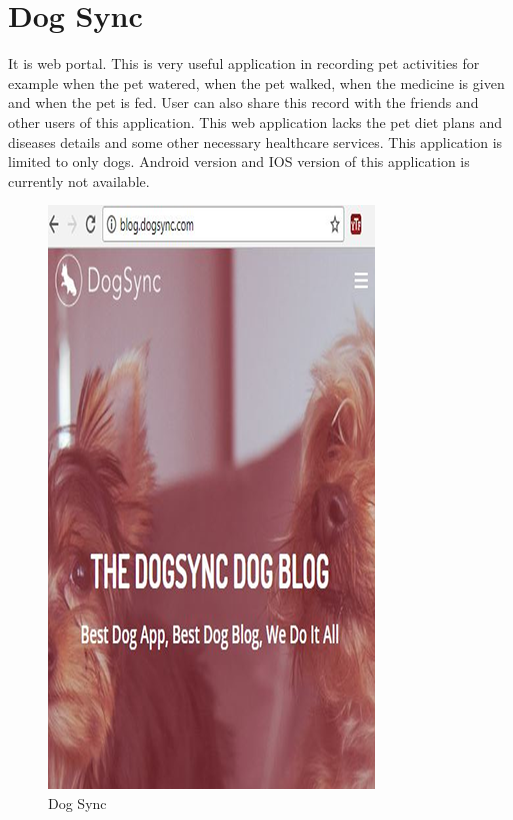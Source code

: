 \section{Dog Sync\cite{capseight}}
It is web portal. This is very useful application in recording pet activities for example when the pet watered, when the pet walked, when the medicine is given and when the pet is fed. User can also share this record with the friends and other users of this application. This web application lacks the pet diet plans and diseases details and some other necessary healthcare services. This application is limited to only dogs. Android version and IOS version of this application is currently not available.
\begin{figure}[H]
  \centering
    \includegraphics[scale=0.3]{23DogSync}
      \caption{Dog Sync}
\end{figure}
